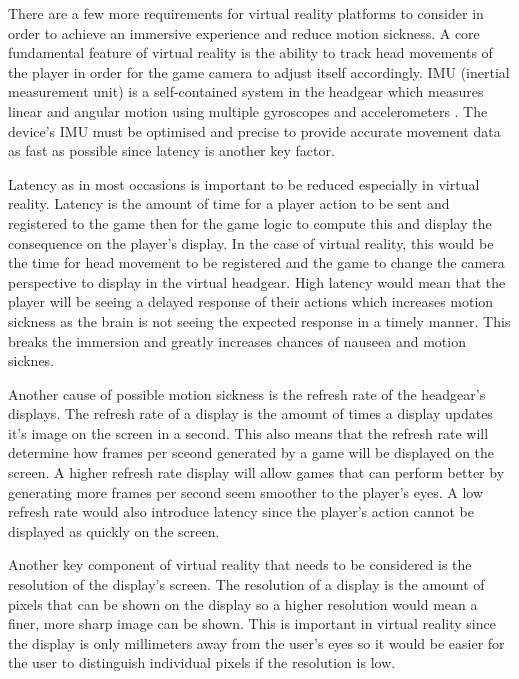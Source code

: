 There are a few more requirements for virtual reality platforms to consider in order to achieve an immersive experience and reduce motion sickness. A core fundamental feature of virtual reality is the ability to track head movements of the player in order for the game camera to adjust itself accordingly. IMU (inertial measurement unit) is a self-contained system in the headgear which measures linear and angular motion using multiple gyroscopes and accelerometers \cite{imu}. The device's IMU must be optimised and precise to provide accurate movement data as fast as possible since latency is another key factor.
\newline
\par
Latency as in most occasions is important to be reduced especially in virtual reality. Latency is the amount of time for a player action to be sent and registered to the game then for the game logic to compute this and display the consequence on the player's display. In the case of virtual reality, this would be the time for head movement to be registered and  the game to change the camera perspective to display in the virtual headgear. High latency would mean that the player will be seeing a delayed response of their actions which increases motion sickness as the brain is not seeing the expected response in a timely manner. This breaks the immersion and greatly increases chances of nauseea and motion sicknes.
\newline
\par
Another cause of possible motion sickness is the refresh rate of the headgear's displays. The refresh rate of a display is the amount of times a display updates it's image on the screen in a second. This also means that the refresh rate will determine how frames per sceond generated by a game will be displayed on the screen. A higher refresh rate display will allow games that can perform better by generating more frames per second seem smoother to the player's eyes. A low refresh rate would also introduce latency since the player's action cannot be displayed as quickly on the screen.
\newline
\par
Another key component of virtual reality that needs to be considered is the resolution of the display's screen. The resolution of a display is the amount of pixels that can be shown on the display so a higher resolution would mean a finer, more sharp image can be shown. This is important in virtual reality since the display is only millimeters away from the user's eyes so it would be easier for the user to distinguish individual pixels if the resolution is low.
